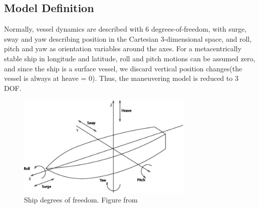 
\subsection{Model Definition}
Normally, vessel dynamics are described with 6 degrees-of-freedom, with surge, sway and yaw describing position in the Cartesian 3-dimensional space, and roll, pitch and yaw as orientation variables around the axes. For a metacentrically stable ship in longitude and latitude, roll and pitch motions can be assumed zero, and since the ship is a surface vessel, we discard vertical position changes(the vessel is always at heave = 0). Thus, the maneuvering model is reduced to 3 DOF.

\begin{figure}[!h]
    \centering
    \includegraphics[width=0.75\textwidth]{fig/ship3dof.jpg}
    \caption{Ship degrees of freedom. Figure from \cite{ship3dof}}
    \label{fig:CSAD}
\end{figure}



